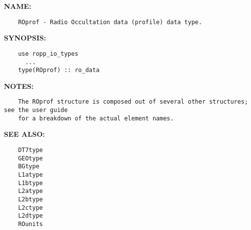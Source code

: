 \label{ch:robo52}
\label{ch:Datatypes_ROprof}
\textbf{NAME:}\hspace{0.08in}\begin{Verbatim}
    ROprof - Radio Occultation data (profile) data type.
\end{Verbatim}
\textbf{SYNOPSIS:}\hspace{0.08in}\begin{Verbatim}
    use ropp_io_types
      ...
    type(ROprof) :: ro_data
\end{Verbatim}
\textbf{NOTES:}\hspace{0.08in}\begin{Verbatim}
    The ROprof structure is composed out of several other structures; see the user guide
    for a breakdown of the actual element names.
\end{Verbatim}
\textbf{SEE ALSO:}\hspace{0.08in}\begin{Verbatim}
    DT7type
    GEOtype
    BGtype
    L1atype
    L1btype
    L2atype
    L2btype
    L2ctype
    L2dtype
    ROunits
\end{Verbatim}
